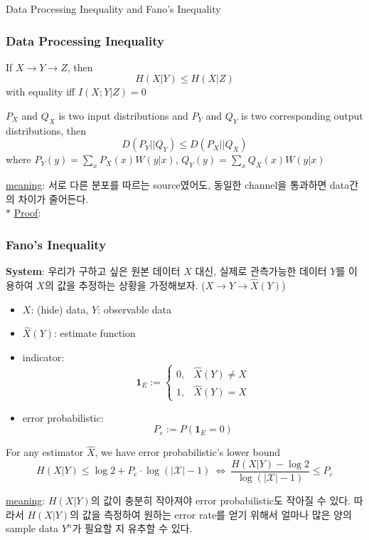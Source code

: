 \documentclass[9pt]{beamer}
\begin{document}
\begin{section}{Data Processing Inequality and Fano's Inequality}
        \begin{frame}
            \frametitle{Data Processing Inequality}
            \begin{corollary}
                If $X \rightarrow Y \rightarrow Z$, then 
                $$ H(X|Y) \le H(X|Z)$$
                with equality iff $I(X;Y|Z) = 0$
            \end{corollary}
            \begin{corollary}
                $P_X$ and $Q_X$ is two input distributions and $P_Y$ and $Q_Y$ is two corresponding output distributions, then
                $$D(P_Y || Q_Y) \le D(P_X || Q_X)$$
                where 
                $P_Y(y) = \sum_x P_X(x) W(y|x)$, $Q_Y(y) = \sum_x Q_X(x) W(y|x)$
            \end{corollary}
            \checkmark \underline{meaning}: 서로 다른 분포를 따르는 source였어도, 동일한 channel을 통과하면 data간의 차이가 줄어든다.
            \vspace{0.2cm}
            \\ $\ast$ \underline{Proof}: 
            \vspace{3cm}
        \end{frame}
    
        \begin{frame}
            \frametitle{Fano's Inequality}
            \textbf{System}: 우리가 구하고 싶은 원본 데이터 $X$ 대신, 실제로 관측가능한 데이터 $Y$를 이용하여 $X$의 값을 추정하는 상황을 가정해보자. ($X \rightarrow Y \rightarrow \hat X(Y)$)
            \begin{itemize}
                \item $X$: (hide) data, $Y$: observable data
                \item $\hat X(Y)$: estimate function 
                \item indicator:
                $$\mathbf 1_E := \begin{cases} 0, & \hat X(Y) \ne X \\ 1, & \hat X(Y) = X\end{cases}$$
                \item error probabilistic:
                $$P_e := P( \mathbf{1}_E =0)$$

            \end{itemize}
            \begin{theorem}
                For any estimator $\hat X$, we have error probabilistic's lower bound
                $$H(X|Y) \le \log 2 + P_e \cdot \log(|\mathcal X| - 1)  \ \Leftrightarrow \  \frac{H(X|Y)-\log 2}{\log (|\mathcal X| - 1)} \le P_e$$
            \end{theorem}
            \checkmark \underline{meaning}: $H(X|Y)$의 값이 충분히 작아져야 error probabilistic도 작아질 수 있다. 따라서 $H(X|Y)$의 값을 측정하여 원하는 error rate를 얻기 위해서 얼마나 많은 양의 sample data $Y^n$가 필요할 지 유추할 수 있다.
        \end{frame}


\end{section}
\end{document}
